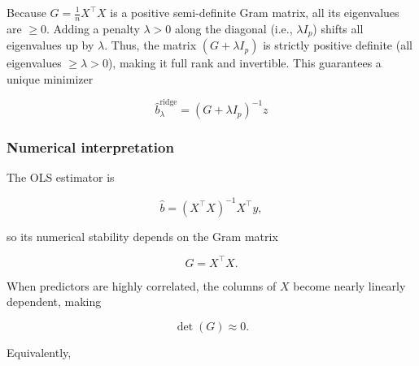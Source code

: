 \documentclass[
  11pt,
]{article}
\newenvironment{Shaded}{\begin{snugshade}}{\end{snugshade}}
\newcommand{\CommentTok}[1]{\textcolor[rgb]{0.56,0.35,0.01}{\textit{#1}}}
\newcommand{\FunctionTok}[1]{\textcolor[rgb]{0.13,0.29,0.53}{\textbf{#1}}}
\newcommand{\NormalTok}[1]{#1}
\newcommand{\OtherTok}[1]{\textcolor[rgb]{0.56,0.35,0.01}{#1}}
\newcommand{\SpecialCharTok}[1]{\textcolor[rgb]{0.81,0.36,0.00}{\textbf{#1}}}
\newcommand{\StringTok}[1]{\textcolor[rgb]{0.31,0.60,0.02}{#1}}
\begin{document}
Because \(G = \frac{1}{n}X^\top X\) is a positive semi-definite Gram
matrix, all its eigenvalues are \(\ge 0\). Adding a penalty
\(\lambda > 0\) along the diagonal (i.e., \(\lambda I_p\)) shifts all
eigenvalues up by \(\lambda\). Thus, the matrix \((G + \lambda I_p)\) is
strictly positive definite (all eigenvalues \(\ge \lambda > 0\)), making
it full rank and invertible. This guarantees a unique minimizer

\[\hat{b}_\lambda^{\text{ridge}} = (G + \lambda I_p)^{-1} z\]

\begin{Shaded}
\end{Shaded}

\subsubsection{Numerical interpretation}\label{numerical-interpretation}

The OLS estimator is

\[\hat b=(X^\top X)^{-1}X^\top y,\]

so its numerical stability depends on the Gram matrix

\[G=X^\top X.\]

When predictors are highly correlated, the columns of \(X\) become
nearly linearly dependent, making

\[\det(G)\approx0.\]

Equivalently,
\end{document}
